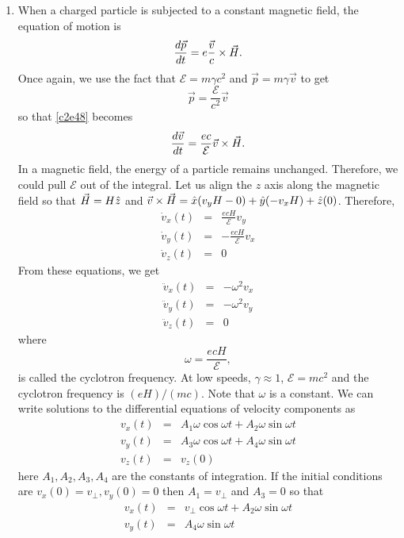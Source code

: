 \begin{enumerate}
\item When a charged particle is subjected to a constant magnetic field, the
equation of motion is
\begin{equation}\label{c3e49}
\frac{d{\vec{p}}}{d{t}} = e\frac{\vec{v}}{c} \times \vec{H}.
\end{equation}
Once again, we use the fact that $\mathcal{E} = m\gamma c^2$ and $\vec{p} = 
m\gamma\vec{v}$ to get
\[
\vec{p} = \frac{\mathcal{E}}{c^2}\vec{v}
\]
so that \eqref{c2e48} becomes
\[
\frac{d{\vec{v}}}{d{t}} = \frac{ec}{\mathcal{E}}\vec{v} \times \vec{H}.
\]
In a magnetic field, the energy of a particle remains unchanged. Therefore, we 
could pull $\mathcal{E}$ out of the integral. Let us align the $z$ axis along
the magnetic field so that $\vec{H} = H\hat{z}$ and $\vec{v} \times \vec{H} = 
\hat{x}(v_yH - 0) + \hat{y}(-v_xH) + \hat{z}(0)$. Therefore,
\begin{eqnarray*}
\dot{v}_x(t) &=& \frac{ecH}{\mathcal{E}}v_y \\
\dot{v}_y(t) &=& -\frac{ecH}{\mathcal{E}}v_x \\
\dot{v}_z(t) &=& 0
\end{eqnarray*}
From these equations, we get
\begin{eqnarray*}
\ddot{v}_x(t) &=& -\omega^2 v_x \\
\ddot{v}_y(t) &=& -\omega^2 v_y \\
\ddot{v}_z(t) &=& 0
\end{eqnarray*}
where
\begin{equation}\label{c3e50}
\omega = \frac{ecH}{\mathcal{E}},
\end{equation}
is called the cyclotron frequency. At low speeds, $\gamma \approx 1$, 
$\mathcal{E} = mc^2$ and the cyclotron frequency is $(eH)/(mc)$. Note that 
$\omega$ is a constant. We can write solutions to the differential equations 
of velocity components as
\begin{eqnarray*}
v_x(t) &=& A_1\omega\cos\omega t + A_2\omega\sin\omega t \\
v_y(t) &=& A_3\omega\cos\omega t + A_4\omega\sin\omega t \\
v_z(t) &=& v_z(0)
\end{eqnarray*}
here $A_1, A_2, A_3, A_4$ are the constants of integration. If the initial
conditions are $v_x(0) = v_{\perp}, v_y(0) = 0$ then $A_1 = v_{\perp}$ and 
$A_3 = 0$ so that
\begin{eqnarray*}
v_x(t) &=& v_\perp\cos\omega t + A_2\omega\sin\omega t \\
v_y(t) &=& A_4\omega\sin\omega t \\

\end{eqnarray*}
\end{enumerate}
